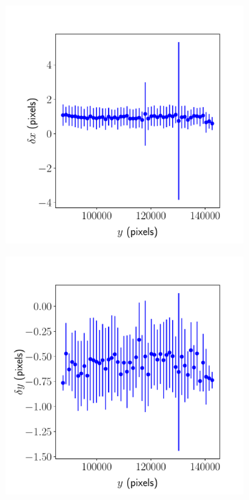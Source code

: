 \documentclass{article}
\begin{document}
\begin{figure}[ht]
\begin{subfigure}{0.24\linewidth}
		\caption{}
		\label{fig:sinewave4yxBMS}
	\end{subfigure}
	\begin{subfigure}{0.24\linewidth}
		\includegraphics[width=\linewidth]{sine-wave-4-xy-BMS.pdf}
		\caption{}
		\label{fig:sinewave4xyBMS}
	\end{subfigure}
	\begin{subfigure}{0.24\linewidth}
		\includegraphics[width=\linewidth]{sine-wave-4-yy-BMS.pdf}

\end{subfigure}
\end{figure}
\end{document}
